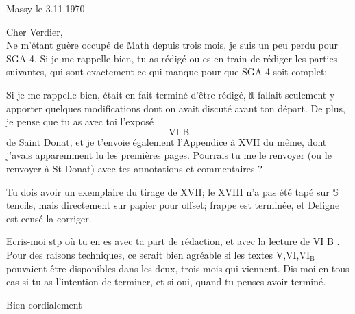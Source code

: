 \begin{flushright}
Massy le 3.11.1970\\
\end{flushright}
Cher Verdier,\\

Ne m'étant guère occupé de Math depuis trois mois, je suis un peu perdu pour SGA 4. Si je me rappelle bien, tu as rédigé ou es en train de rédiger les parties suivantes, qui sont exactement ce qui manque pour que SGA 4 soit complet:

Si je me rappelle bien,  était en fait terminé d'être rédigé, \(\mathbb{il}\) fallait seulement y apporter quelques modifications dont on avait discuté avant ton départ. De plus, je pense que tu as avec toi l'exposé
\[
\text{VI B}
\]
de Saint Donat, et je t'envoie également l'Appendice à XVII du même, dont j'avais apparemment lu les premières pages. P\(\mathbb{o}\)urrais tu me le renvoyer (ou le renvoyer à St Donat) avec tes annotations et commentaires ?

Tu dois avoir un exemplaire du tirage de XVII; le XVIII n'a pas été tapé sur \(\mathbb{S}\)tencils, mais directement sur papier pour offset;  frappe est terminée, et Deligne est censé la corriger.

Ecris-moi stp où tu en es avec ta part de rédaction, et avec la lecture de VI B .  Pour des raisons techniques, ce serait bien agréable si les textes V,VI,\(\mathrm{VI}_{\mathrm{B}}\) pouvaient être disponibles dans les deux, trois mois qui viennent. Dis-moi en tous cas si tu as l'intention de terminer, et si oui, quand tu penses avoir terminé.

Bien cordialement\\
